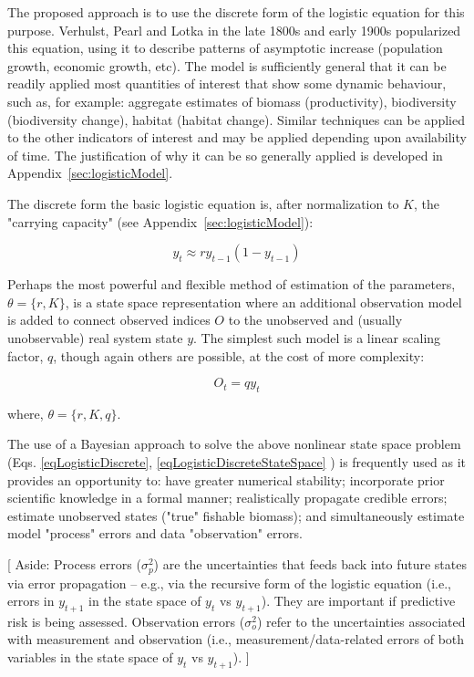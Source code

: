 \documentclass[letterpaper,portrait,11pt]{scrartcl}
\numberwithin{equation}{section}		%
\numberwithin{figure}{section}		%
\numberwithin{table}{section}				%
\begin{document}
The proposed approach is to use the discrete form of the logistic equation for this purpose. Verhulst, Pearl and Lotka in the late 1800s and early 1900s popularized this equation, using it to describe patterns of asymptotic increase (population growth, economic growth, etc). The model is sufficiently general that it can be readily applied most quantities of interest that show some dynamic behaviour, such as, for example: aggregate estimates of biomass (productivity), biodiversity (biodiversity change), habitat (habitat change). Similar techniques can be applied to the other indicators of interest and may be applied depending upon availability of time. The justification of why it can be so generally applied is developed in Appendix~\ref{sec:logisticModel}.

The discrete form the basic logistic equation is, after normalization to $K$, the "carrying capacity" (see Appendix~\ref{sec:logisticModel}):

\begin{equation} 
\label{eqLogisticDiscrete}
y_t  \approx r y_{t-1} (1 - y_{t-1} )
\end{equation}

Perhaps the most powerful and flexible method of estimation of the parameters, $\theta=\{r,K\}$, is a state space representation where an additional observation model is added to connect observed indices $O$ to the unobserved and (usually unobservable) real system state $y$. The simplest such model is a linear scaling factor, $q$, though again others are possible, at the cost of more complexity: 

\begin{equation} 
\label{eqLogisticDiscreteStateSpace}
O_t = q y_t
\end{equation}


where, $\theta=\{r,K,q\}$.

The use of a Bayesian approach to solve the above nonlinear state space problem (Eqs. \ref{eqLogisticDiscrete}, \ref{eqLogisticDiscreteStateSpace} ) is frequently used as it provides an opportunity to: have greater numerical stability; incorporate prior scientific knowledge in a formal manner; realistically propagate credible errors; estimate unobserved states ("true" fishable biomass); and simultaneously estimate model "process" errors and data "observation" errors. 

[ Aside: Process errors ($\sigma^2_p$) are the uncertainties that feeds back into future states via error propagation -- e.g., via the recursive form of the logistic equation (i.e., errors in $y_{t+1}$ in the state space of $y_t$ vs $y_{t+1}$). They are important if predictive risk is being assessed. Observation errors ($\sigma^2_o$) refer to the uncertainties associated with measurement and observation (i.e., measurement/data-related errors of both variables in the state space of $y_t$ vs $y_{t+1}$). ]
\end{document}
